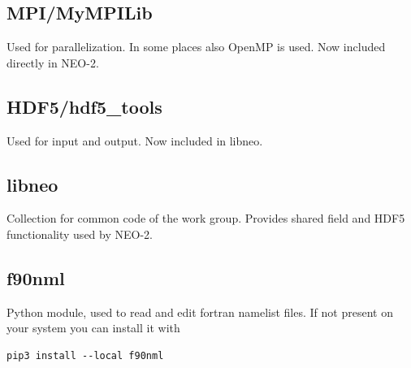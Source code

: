 \subsection{MPI/MyMPILib}
Used for parallelization. In some places also OpenMP is used.
Now included directly in NEO-2.

\subsection{HDF5/hdf5\_tools}
Used for input and output.
Now included in libneo.

\subsection{libneo}
Collection for common code of the work group.
Provides shared field and HDF5 functionality used by NEO-2.

\subsection{f90nml}
Python module, used to read and edit fortran namelist files.
If not present on your system you can install it with
\begin{verbatim}
pip3 install --local f90nml
\end{verbatim}
